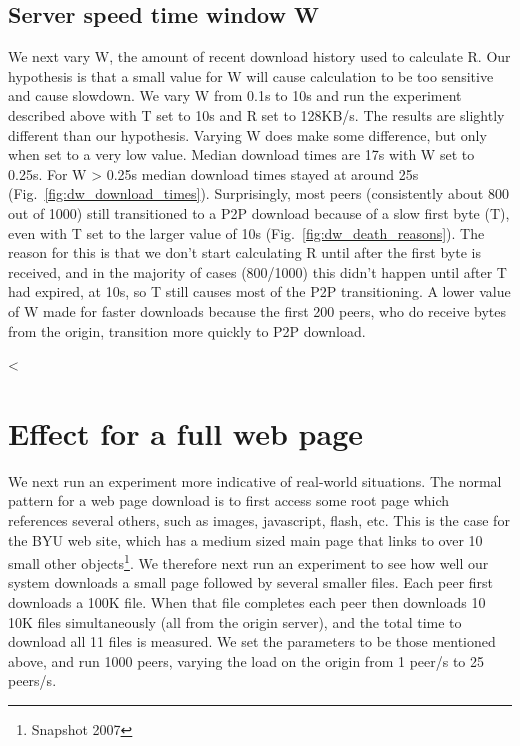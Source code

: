 \subsection{Server speed time window W}

We next vary W, the amount of recent download history used to calculate R.  Our hypothesis is that a small value for W will cause calculation to be too sensitive and cause slowdown.  We vary W from 0.1s to 10s and run the experiment described above with T set to 10s and R set to 128KB/s.  The results are slightly different than our hypothesis.  Varying W does make some difference, but only when set to a very low value.  Median download times are 17s with W set to 0.25s.  For W \textgreater{} 0.25s median download times stayed at around 25s (Fig.~\ref{fig:dw_download_times}).  Surprisingly, most peers (consistently about 800 out of 1000) still transitioned to a P2P download because of a slow first byte (T), even with T set to the larger value of 10s (Fig.~\ref{fig:dw_death_reasons}).  The reason for this is that we don't start calculating R until after the first byte is received, and in the majority of cases (800/1000) this didn't happen until after T had expired, at 10s, so T still causes most of the P2P transitioning.  A lower value of W made for faster downloads because the first 200 peers, who do receive bytes from the origin, transition more quickly to P2P download.



<%

\section{Effect for a full web page}

We next run an experiment more indicative of real-world situations.  The normal pattern for a web page download is to first access some root page which references several others, such as images, javascript, flash, etc.  This is the case for the BYU web site, which has a medium sized main page that links to over 10 small other objects\footnote{Snapshot 2007}.  We therefore next run an experiment to see how well our system downloads a small page followed by several smaller files.  Each peer first downloads a 100K file.  When that file completes each peer then downloads 10 10K files simultaneously (all from the origin server), and the total time to download all 11 files is measured.  We set the parameters to be those mentioned above, and run 1000 peers, varying the load on the origin from 1 peer/s to 25 peers/s.

